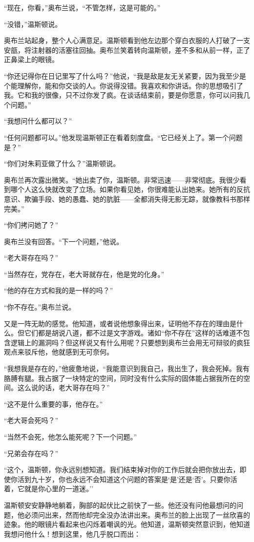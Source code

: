 ``现在，你看，''奥布兰说，``不管怎样，这是可能的。''

``没错，''温斯顿说。

奥布兰站起身，整个人心满意足。温斯顿看到他左边那个穿白衣服的人打破了一支安瓿，将注射器的活塞往回抽。奥布兰笑着转向温斯顿，差不多和从前一样，正了正鼻梁上的眼镜。

``你还记得你在日记里写了什么吗？''他说，``我是敌是友无关紧要，因为我至少是个能理解你，能和你交谈的人。你说得没错。我喜欢和你讲话。你的思想吸引了我。它和我的很像，只不过你发了疯。在谈话结束前，要是你愿意，你可以问我几个问题。''

``我想问什么都可以？''

``任何问题都可以。''他发现温斯顿正在看着刻度盘。``它已经关上了。第一个问题是？''

``你们对朱莉亚做了什么？''温斯顿说。

奥布兰再次露出微笑。``她出卖了你，温斯顿。非常迅速——非常彻底。我很少看到哪个人这么快就改变了立场。如果你看见她，你很难能认出她来。她所有的反抗意识、欺骗手段、她的愚蠢、她的肮脏——全都消失得无影无踪，就像教科书那样完美。''

``你们拷问她了？''

奥布兰没有回答。``下一个问题，''他说。

``老大哥存在吗？''

``当然存在，党存在，老大哥就存在，他是党的化身。''

``他的存在方式和我的是一样的吗？''

``你不存在。''奥布兰说。

又是一阵无助的感觉。他知道，或者说他想象得出来，证明他不存在的理由是什么。但它们都是胡说八道，都不过是文字游戏。诸如``你不存在''这样的话难道不包含逻辑上的漏洞吗？但这样说又有什么用呢？只要想到奥布兰会用无可辩驳的疯狂观点来驳斥他，他就感到无可奈何。

``我想我是存在的，''他疲惫地说，``我能意识到我自己，我出生了，我会死掉。我有胳膊有腿。我占据了一块特定的空间，同时没有什么实际的固体能占据我所在的空间。这么说的话，老大哥存在吗？''

``这不是什么重要的事，他存在。''

``老大哥会死吗？''

``当然不会死，他怎么能死呢？下一个问题。''

``兄弟会存在吗？''

``这个，温斯顿，你永远别想知道。我们结束掉对你的工作后就会把你放出去，即使你活到九十岁，你也永远不会知道这个问题的答案是`是'还是`否'。只要你活着，它就是你心里的一道迷。''

温斯顿安安静静地躺着，胸部的起伏比之前快了一些。他还没有问他最想问的问题，他必须问出来，然而他却完全没办法讲出来。奥布兰的脸上出现了一丝欣喜的迹象。他的眼镜片看起来也闪烁着嘲讽的光。他知道，温斯顿突然意识到，他知道我想问他什么！想到这里，他几乎脱口而出：

